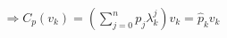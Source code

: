 \documentclass[preview]{standalone}
\begin{document}
\begin{align*}
\Rightarrow C_p(v_k) = \left( \sum_{j=0}^n p_j \lambda_k^j \right) v_k = \hat{p}_k v_k
\end{align*}
\end{document}
